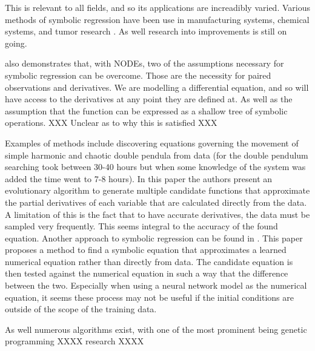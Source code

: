 \documentclass[12pt]{amsart}
\begin{document}
    This is relevant to all fields, and so its applications are increadibly varied. Various methods of symbolic regression have been use in manufacturing systems, chemical systems, and tumor research \cite{can2011comparison,keith2021combining,yoshihara2013inferring}. As well research into improvements is still on going.

    \cite{kidger2022neural} also demonstrates that, with NODEs, two of the assumptions necessary for symbolic regression can be overcome. Those are the necessity for paired observations and derivatives. We are modelling a differential equation, and so will have access to the derivatives at any point they are defined at. As well as the assumption that the function can be expressed as a shallow tree of symbolic operations. XXX Unclear as to why this is satisfied XXX 

    Examples of methods include discovering equations governing the movement of simple harmonic and chaotic double pendula from data\cite{schmidt2009distilling} (for the double pendulum searching took between 30-40 hours but when some knowledge of the system was added the time went to 7-8 hours). In this paper the authors present an evolutionary algorithm to generate multiple candidate functions that approximate the partial derivatives of each variable that are calculated directly from the data. A limitation of this is the fact that to have accurate derivatives, the data must be sampled very frequently. This seems integral to the accuracy of the found equation. Another approach to symbolic regression can be found in \cite{bongard2007automated}. This paper proposes a method to find a symbolic equation that approximates a learned numerical equation rather than directly from data. The candidate equation is then tested against the numerical equation in such a way that the difference between the two. Especially when using a neural network model as the numerical equation, it seems these process may not be useful if the initial conditions are outside of the scope of the training data.   


    As well numerous algorithms exist, with one of the most prominent being genetic programming XXXX research XXXX

 

    \printbibliography
\end{document}
